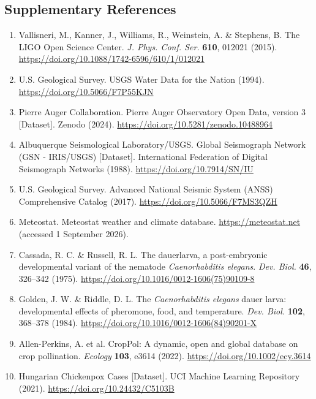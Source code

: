 \documentclass{article}
\begin{document}
\subsection*{Supplementary References}
\label{sec:si-sources}
\footnotesize
\begin{enumerate}[label=S\arabic*.,ref=S\arabic*,leftmargin=2.8em,itemsep=0.6em]
\item \label{src:S1} Vallisneri, M., Kanner, J., Williams, R., Weinstein, A. \& Stephens, B. The LIGO Open Science Center. \textit{J. Phys. Conf. Ser.} \textbf{610}, 012021 (2015). \url{https://doi.org/10.1088/1742-6596/610/1/012021}
\item \label{src:S2} U.S. Geological Survey. USGS Water Data for the Nation (1994). \url{https://doi.org/10.5066/F7P55KJN}
\item \label{src:S3} Pierre Auger Collaboration. Pierre Auger Observatory Open Data, version 3 [Dataset]. Zenodo (2024). \url{https://doi.org/10.5281/zenodo.10488964}
\item \label{src:S4} Albuquerque Seismological Laboratory/USGS. Global Seismograph Network (GSN - IRIS/USGS) [Dataset]. International Federation of Digital Seismograph Networks (1988). \url{https://doi.org/10.7914/SN/IU}
\item \label{src:S5} U.S. Geological Survey. Advanced National Seismic System (ANSS) Comprehensive Catalog (2017). \url{https://doi.org/10.5066/F7MS3QZH}
\item \label{src:S6} Meteostat. Meteostat weather and climate database. \url{https://meteostat.net} (accessed 1 September 2026).
\item \label{src:S7} Cassada, R. C. \& Russell, R. L. The dauerlarva, a post-embryonic developmental variant of the nematode \textit{Caenorhabditis elegans}. \textit{Dev. Biol.} \textbf{46}, 326--342 (1975). \url{https://doi.org/10.1016/0012-1606(75)90109-8}
\item \label{src:S8} Golden, J. W. \& Riddle, D. L. The \textit{Caenorhabditis elegans} dauer larva: developmental effects of pheromone, food, and temperature. \textit{Dev. Biol.} \textbf{102}, 368--378 (1984). \url{https://doi.org/10.1016/0012-1606(84)90201-X}
\item \label{src:S9} Allen-Perkins, A. et al. CropPol: A dynamic, open and global database on crop pollination. \textit{Ecology} \textbf{103}, e3614 (2022). \url{https://doi.org/10.1002/ecy.3614}
\item \label{src:S10} Hungarian Chickenpox Cases [Dataset]. UCI Machine Learning Repository (2021). \url{https://doi.org/10.24432/C5103B}

\end{enumerate}
\end{document}
